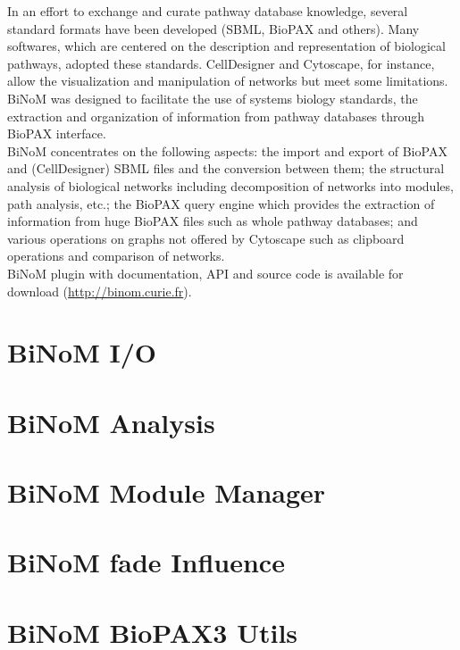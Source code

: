 \documentclass[11pt]{article}
\begin{document}
In an effort to exchange and curate pathway database knowledge, several standard
formats have been developed (SBML, BioPAX \cite{stromback2005representation} and
others). Many softwares, which are centered on the description and
representation of biological pathways, adopted these standards.
CellDesigner\cite{kitano2005using} and Cytoscape\cite{shannon2003cytoscape}, for
instance, allow the visualization and manipulation of networks but meet some
limitations. BiNoM was designed to facilitate the use of systems biology
standards, the extraction and organization of information from pathway databases
through BioPAX interface.\\

BiNoM concentrates on the following aspects: the import and export of BioPAX and
(CellDesigner) SBML files and the conversion between them; the structural
analysis of biological networks including decomposition of networks into
modules, path analysis, etc.; the BioPAX query engine which provides the
extraction of information from huge BioPAX files such as whole pathway
databases; and various operations on graphs not offered by Cytoscape such as
clipboard operations and comparison of networks.\\

BiNoM plugin with documentation, API and source code is available for download (\url{http://binom.curie.fr}).\\

\section{BiNoM I/O}

\clearpage

\section{BiNoM Analysis}

\clearpage

\section{BiNoM Module Manager}

\clearpage

\section{BiNoM fade Influence}

\clearpage

\section{BiNoM BioPAX3 Utils}

\clearpage
\end{document}
